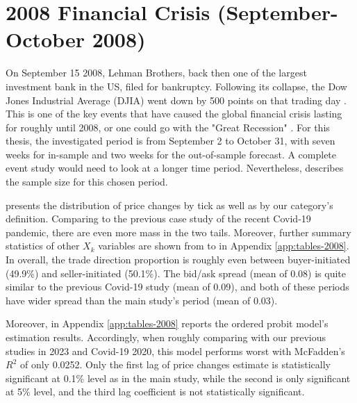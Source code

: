 \section{2008 Financial Crisis (September-October 2008)}

On September 15 2008, Lehman Brothers, back then one of the largest investment bank in the US, filed for bankruptcy. Following its collapse, the Dow Jones Industrial Average (DJIA) went down by 500 points on that trading day \citep{johnson&mamun2012}. This is one of the key events that have caused the global financial crisis lasting for roughly until 2008, or one could go with the "Great Recession" \citep{islam&verick2011}. For this thesis, the investigated period is from September 2 to October 31, with seven weeks for in-sample and two weeks for the out-of-sample forecast. A complete event study would need to look at a longer time period. Nevertheless,  describes the sample size for this chosen period.

 presents the distribution of price changes by tick as well as by our category's definition. Comparing to the previous case study of the recent Covid-19 pandemic, there are even more mass in the two tails. Moreover, further summary statistics of other $X_k$ variables are shown from  to  in Appendix \ref{app:tables-2008}. In overall, the trade direction proportion is roughly even between buyer-initiated (49.9\%) and seller-initiated (50.1\%). The bid/ask spread (mean of 0.08) is quite similar to the previous Covid-19 study (mean of 0.09), and both of these periods have wider spread than the main study's period (mean of 0.03).

Moreover,  in Appendix \ref{app:tables-2008} reports the ordered probit model's estimation results. Accordingly, when roughly comparing with our previous studies in 2023 and Covid-19 2020, this model performs worst with McFadden's $R^2$ of only 0.0252. Only the first lag of price changes estimate is statistically significant at 0.1\% level as in the main study, while the second is only significant at 5\% level, and the third lag coefficient is not statistically significant.


